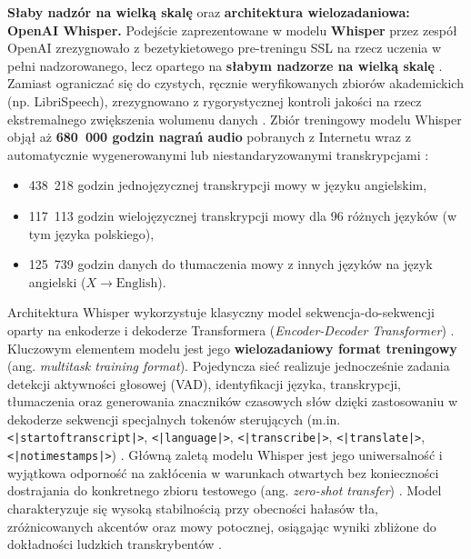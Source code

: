\textbf{Słaby nadzór na wielką skalę} oraz \textbf{architektura wielozadaniowa: OpenAI Whisper.} Podejście zaprezentowane w modelu \textbf{Whisper} przez zespół OpenAI zrezygnowało z bezetykietowego pre-treningu SSL na rzecz uczenia w pełni nadzorowanego, lecz opartego na \textbf{słabym nadzorze na wielką skalę} \cite[s.~1--2]{radford2023robust}. Zamiast ograniczać się do czystych, ręcznie weryfikowanych zbiorów akademickich (np. LibriSpeech), zrezygnowano z rygorystycznej kontroli jakości na rzecz ekstremalnego zwiększenia wolumenu danych \cite[s.~1--2]{radford2023robust}. Zbiór treningowy modelu Whisper objął aż \textbf{680~000 godzin nagrań audio} pobranych z Internetu wraz z automatycznie wygenerowanymi lub niestandaryzowanymi transkrypcjami \cite[s.~1--3]{radford2023robust}:
\begin{itemize}
\item 438~218 godzin jednojęzycznej transkrypcji mowy w języku angielskim,

\item 117~113 godzin wielojęzycznej transkrypcji mowy dla 96 różnych języków (w tym języka polskiego),

\item 125~739 godzin danych do tłumaczenia mowy z innych języków na język angielski ($X \rightarrow \text{English}$).
\end{itemize}
Architektura Whisper wykorzystuje klasyczny model sekwencja-do-sekwencji oparty na enkoderze i dekoderze Transformera (\textit{Encoder-Decoder Transformer}) \cite[s.~2--3]{radford2023robust}. Kluczowym elementem modelu jest jego \textbf{wielozadaniowy format treningowy} (ang. \textit{multitask training format}). Pojedyncza sieć realizuje jednocześnie zadania detekcji aktywności głosowej (VAD), identyfikacji języka, transkrypcji, tłumaczenia oraz generowania znaczników czasowych słów dzięki zastosowaniu w dekoderze sekwencji specjalnych tokenów sterujących (m.in. \texttt{\textless|startoftranscript|\textgreater}, \texttt{\textless|language|\textgreater}, \texttt{\textless|transcribe|\textgreater}, \texttt{\textless|translate|\textgreater}, \texttt{\textless|notimestamps|\textgreater}) \cite[s.~3--4]{radford2023robust}. Główną zaletą modelu Whisper jest jego uniwersalność i wyjątkowa odporność na zakłócenia w warunkach otwartych bez konieczności dostrajania do konkretnego zbioru testowego (ang. \textit{zero-shot transfer}) \cite[s.~1, 5--6]{radford2023robust}. Model charakteryzuje się wysoką stabilnością przy obecności hałasów tła, zróżnicowanych akcentów oraz mowy potocznej, osiągając wyniki zbliżone do dokładności ludzkich transkrybentów \cite[s.~10]{radford2023robust}.

